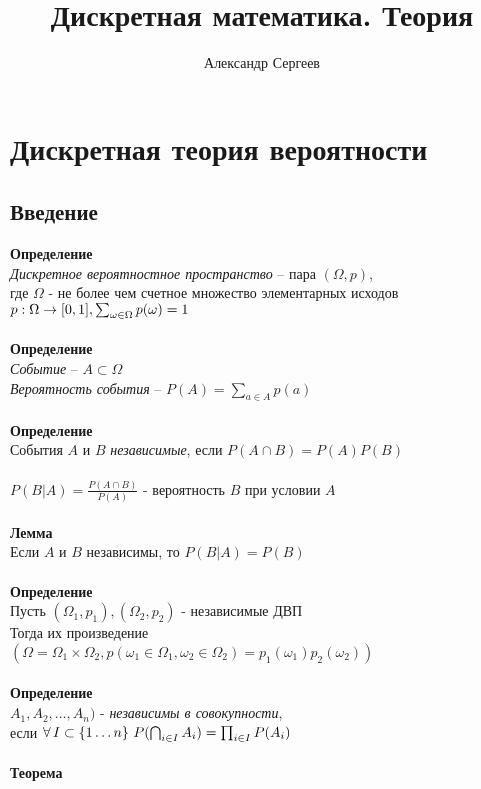 \documentclass[12pt]{article}
\title{Дискретная математика. Теория}
\author{Александр Сергеев}
\date{}
\begin{document}
\maketitle
\section{Дискретная теория вероятности}
\subsection{Введение}
\textbf{Определение}\\
\textit{Дискретное вероятностное пространство} -- пара $(\Omega, p)$,\\
где $\Omega$ - не более чем счетное множество элементарных исходов\\
$p: \Omega \rightarrow [0, 1], \sum_{\omega \in \Omega} p(\omega) = 1$\\\\
\textbf{Определение}\\
\textit{Событие} -- $A \subset \Omega$\\
\textit{Вероятность события} -- $P(A) = \sum_{a \in A} p(a)$\\\\
\textbf{Определение}\\
События $A$ и $B$ \textit{независимые}, если $P(A \cap B) = P(A)P(B)$\\\\
$P(B|A) = \frac{P(A \cap B)}{P(A)}$ - вероятность $B$ при условии $A$\\\\
\textbf{Лемма}\\
Если $A$ и $B$ независимы, то $P(B|A) = P(B)$\\\\
\textbf{Определение}\\
Пусть $(\Omega_1, p_1), (\Omega_2, p_2)$ - независимые ДВП\\
Тогда их произведение $(\Omega = \Omega_1 \times \Omega_2, p(\omega_1 \in \Omega_1, \omega_2 \in \Omega_2) = p_1(\omega_1)p_2(\omega_2))$\\\\
\textbf{Определение}\\
$A_1, A_2, \ldots, A_n)$ - \textit{независимы в совокупности},\\
если $\fall I \subset \{1\ldots n\}\ P(\bigcap_{i\in I} A_i) = \prod_{i\in I}P(A_i)$\\\\
\textbf{Теорема}\\
\end{document}
